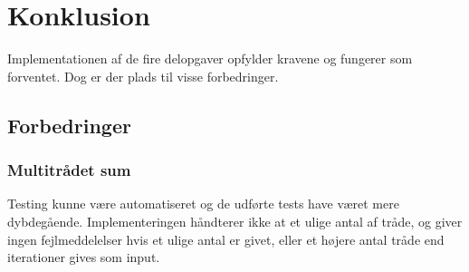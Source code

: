 \section{Konklusion}
Implementationen af de fire delopgaver opfylder kravene og fungerer som forventet. Dog er der plads til visse forbedringer. 


\subsection{Forbedringer}

\subsubsection{Multitrådet sum}
Testing kunne være automatiseret og de udførte tests have været mere dybdegående. Implementeringen håndterer ikke at et ulige antal af tråde, og giver ingen fejlmeddelelser hvis et ulige antal er givet, eller et højere antal tråde end iterationer gives som input.